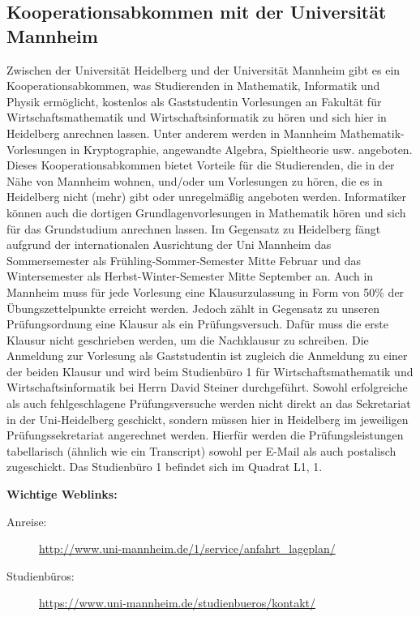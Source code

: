 \subsection{Kooperationsabkommen mit der Universität Mannheim}
Zwischen der Universität Heidelberg und der Universität Mannheim gibt es ein Kooperationsabkommen, was Studierenden in Mathematik, Informatik und Physik ermöglicht, kostenlos als Gaststudentin Vorlesungen an Fakultät für Wirtschaftsmathematik und Wirtschaftsinformatik zu hören und sich hier in Heidelberg anrechnen lassen. Unter anderem werden in Mannheim Mathematik-Vorlesungen in Kryptographie, angewandte Algebra, Spieltheorie usw. angeboten. Dieses Kooperationsabkommen bietet Vorteile für die Studierenden, die in der Nähe von Mannheim wohnen, und/oder um Vorlesungen zu hören, die es in Heidelberg nicht (mehr) gibt oder unregelmäßig angeboten werden. Informatiker können auch die dortigen Grundlagenvorlesungen in Mathematik hören und sich für das Grundstudium anrechnen lassen. Im Gegensatz zu Heidelberg fängt aufgrund der internationalen Ausrichtung der Uni Mannheim das Sommersemester als Frühling-Sommer-Semester Mitte Februar und das Wintersemester als Herbst-Winter-Semester Mitte September an. Auch in Mannheim muss für jede Vorlesung eine Klausurzulassung in Form von 50\% der Übungszettelpunkte erreicht werden. Jedoch zählt in Gegensatz zu unseren Prüfungsordnung eine Klausur als ein Prüfungsversuch. Dafür muss die erste Klausur nicht geschrieben werden, um die Nachklausur zu schreiben. Die Anmeldung zur Vorlesung als Gaststudentin ist zugleich die Anmeldung zu einer der beiden Klausur und wird beim Studienbüro 1 für Wirtschaftsmathematik und Wirtschaftsinformatik bei Herrn David Steiner durchgeführt. Sowohl erfolgreiche als auch fehlgeschlagene Prüfungsversuche werden nicht direkt an das Sekretariat in der Uni-Heidelberg geschickt, sondern müssen hier in Heidelberg im jeweiligen Prüfungssekretariat angerechnet werden. Hierfür werden die Prüfungsleistungen tabellarisch (ähnlich wie ein Transcript) sowohl per E-Mail als auch postalisch zugeschickt. Das Studienbüro 1 befindet sich im Quadrat L1, 1. 

\textbf{Wichtige Weblinks:} 
\begin{description}
\item[Anreise:] \url{http://www.uni-mannheim.de/1/service/anfahrt_lageplan/}
\item[Studienbüros:] \url{https://www.uni-mannheim.de/studienbueros/kontakt/}
\end{description}
